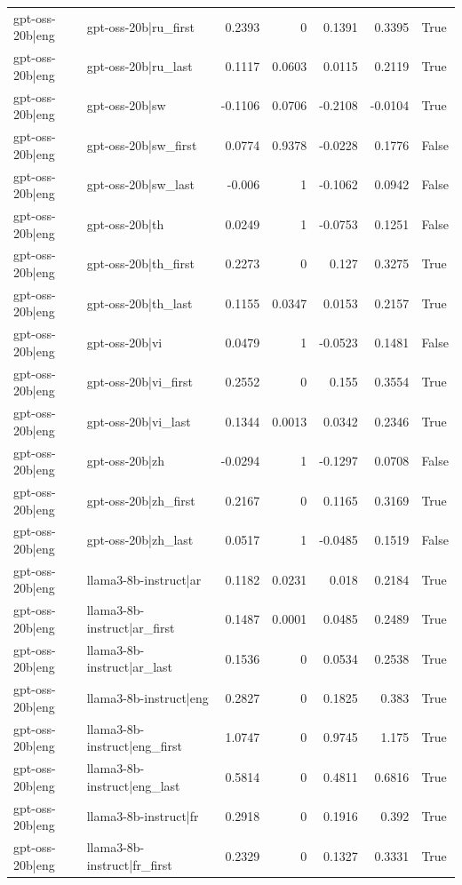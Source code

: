 \begin{table}
\begin{tabular}{l l r r r r l}
gpt-oss-20b|eng & gpt-oss-20b|ru_first & 0.2393 & 0 & 0.1391 & 0.3395 & True \\
gpt-oss-20b|eng & gpt-oss-20b|ru_last & 0.1117 & 0.0603 & 0.0115 & 0.2119 & True \\
gpt-oss-20b|eng & gpt-oss-20b|sw & -0.1106 & 0.0706 & -0.2108 & -0.0104 & True \\
gpt-oss-20b|eng & gpt-oss-20b|sw_first & 0.0774 & 0.9378 & -0.0228 & 0.1776 & False \\
gpt-oss-20b|eng & gpt-oss-20b|sw_last & -0.006 & 1 & -0.1062 & 0.0942 & False \\
gpt-oss-20b|eng & gpt-oss-20b|th & 0.0249 & 1 & -0.0753 & 0.1251 & False \\
gpt-oss-20b|eng & gpt-oss-20b|th_first & 0.2273 & 0 & 0.127 & 0.3275 & True \\
gpt-oss-20b|eng & gpt-oss-20b|th_last & 0.1155 & 0.0347 & 0.0153 & 0.2157 & True \\
gpt-oss-20b|eng & gpt-oss-20b|vi & 0.0479 & 1 & -0.0523 & 0.1481 & False \\
gpt-oss-20b|eng & gpt-oss-20b|vi_first & 0.2552 & 0 & 0.155 & 0.3554 & True \\
gpt-oss-20b|eng & gpt-oss-20b|vi_last & 0.1344 & 0.0013 & 0.0342 & 0.2346 & True \\
gpt-oss-20b|eng & gpt-oss-20b|zh & -0.0294 & 1 & -0.1297 & 0.0708 & False \\
gpt-oss-20b|eng & gpt-oss-20b|zh_first & 0.2167 & 0 & 0.1165 & 0.3169 & True \\
gpt-oss-20b|eng & gpt-oss-20b|zh_last & 0.0517 & 1 & -0.0485 & 0.1519 & False \\
gpt-oss-20b|eng & llama3-8b-instruct|ar & 0.1182 & 0.0231 & 0.018 & 0.2184 & True \\
gpt-oss-20b|eng & llama3-8b-instruct|ar_first & 0.1487 & 0.0001 & 0.0485 & 0.2489 & True \\
gpt-oss-20b|eng & llama3-8b-instruct|ar_last & 0.1536 & 0 & 0.0534 & 0.2538 & True \\
gpt-oss-20b|eng & llama3-8b-instruct|eng & 0.2827 & 0 & 0.1825 & 0.383 & True \\
gpt-oss-20b|eng & llama3-8b-instruct|eng_first & 1.0747 & 0 & 0.9745 & 1.175 & True \\
gpt-oss-20b|eng & llama3-8b-instruct|eng_last & 0.5814 & 0 & 0.4811 & 0.6816 & True \\
gpt-oss-20b|eng & llama3-8b-instruct|fr & 0.2918 & 0 & 0.1916 & 0.392 & True \\
gpt-oss-20b|eng & llama3-8b-instruct|fr_first & 0.2329 & 0 & 0.1327 & 0.3331 & True \\

\end{tabular}
\end{table}
